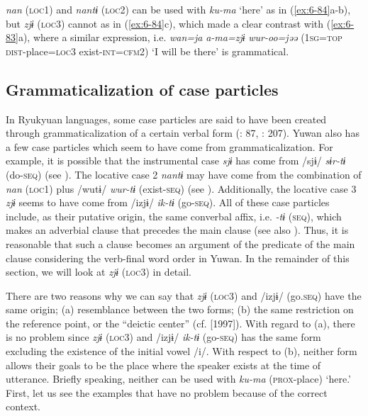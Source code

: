 \textit{nan} (\textsc{loc1}) and \textit{nantɨ} (\textsc{loc2}) can be used with \textit{ku-ma} ‘here’ as in (\ref{ex:6-84}a-b), but \textit{zjɨ} (\textsc{loc3}) cannot as in (\ref{ex:6-84}c), which made a clear contrast with (\ref{ex:6-83}a), where a similar expression, i.e. \textit{wan=ja} \textit{a-ma=zjɨ} \textit{wur-oo=jəə} (1\textsc{sg}=\textsc{top} \textsc{dist}-place=\textsc{loc3} exist-\textsc{int}=\textsc{cfm}2) ‘I will be there’ is grammatical.

\subsection{Grammaticalization of case particles}

In Ryukyuan languages, some case particles are said to have been created through grammaticalization of a certain verbal form (\citealt{NishiokaNakahara2000}: 87, \citealt{Shimoji2008}: 207). Yuwan also has a few case particles which seem to have come from grammaticalization. For example, it is possible that the instrumental case \textit{sjɨ} has come from /sjɨ/ \textit{sɨr-tɨ} (do-\textsc{seq}) (see ). The locative case 2 \textit{nantɨ} may have come from the combination of \textit{nan} (\textsc{loc1}) plus /wutɨ/ \textit{wur-tɨ} (exist-\textsc{seq}) (see ). Additionally, the locative case 3 \textit{zjɨ} seems to have come from /izjɨ/ \textit{ik-tɨ} (go-\textsc{seq}). All of these case particles include, as their putative origin, the same converbal affix, i.e. \textit{-tɨ} (\textsc{seq}), which makes an adverbial clause that precedes the main clause (see also ). Thus, it is reasonable that such a clause becomes an argument of the predicate of the main clause considering the verb-final word order in Yuwan. In the remainder of this section, we will look at \textit{zjɨ} (\textsc{loc3}) in detail.

There are two reasons why we can say that \textit{zjɨ} (\textsc{loc3}) and /izjɨ/ (go.\textsc{seq}) have the same origin; (a) resemblance between the two forms; (b) the same restriction on the reference point, or the “deictic center” (cf. \citealt{Fillmore1971} [1997]). With regard to (a), there is no problem since \textit{zjɨ} (\textsc{loc3}) and /izjɨ/ \textit{ik-tɨ} (go-\textsc{seq}) has the same form excluding the existence of the initial vowel /i/. With respect to (b), neither form allows their goals to be the place where the speaker exists at the time of utterance. Briefly speaking, neither can be used with \textit{ku-ma} (\textsc{prox}-place) ‘here.’ First, let us see the examples that have no problem because of the correct context.

